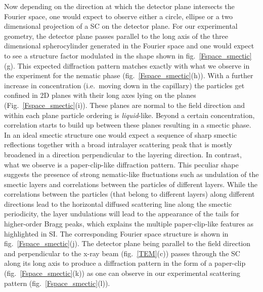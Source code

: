 \documentclass[aps,prl,preprint,superscriptaddress]{revtex4-1} %
\begin{document}
Now depending on the direction at which the detector plane intersects the Fourier space, one would expect to observe either a circle, ellipse or a two dimensional projection of a SC on the detector plane. For our experimental geometry, the detector plane passes parallel to the long axis of the three dimensional spherocylinder generated in the Fourier space and one would expect to see a structure factor modulated in the shape shown in fig.~\ref{Fspace_smectic}(g). This expected diffraction pattern matches exactly with what we observe in the experiment for the nematic phase (fig.~\ref{Fspace_smectic}(h)). With a further increase in concentration (i.e.~moving down in the capillary) the particles get confined in 2D planes with their long axes lying on the planes (Fig.~\ref{Fspace_smectic}(i)). These planes are normal to the field direction and within each plane particle ordering is \emph{liquid}-like. Beyond a certain concentration, correlation starts to build up between these planes resulting in a smectic phase. In an ideal smectic structure one would expect a sequence of sharp smectic reflections together with a broad intralayer scattering peak that is mostly broadened in a direction perpendicular to the layering direction. In contrast, what we observe is a paper-clip-like diffraction pattern. This peculiar shape suggests the presence of strong nematic-like fluctuations such as undulation of the smectic layers and correlations between the particles of different layers. While the correlations between the particles (that belong to different layers) along different directions lead to the horizontal diffused scattering line along the smectic periodicity, the layer undulations will lead to the appearance of the tails for higher-order Bragg peaks, which explains the multiple paper-clip-like features as highlighted in SI\@. The corresponding Fourier space structure is shown in fig.~\ref{Fspace_smectic}(j). The detector plane being parallel to the field direction and perpendicular to the x-ray beam (fig.~\ref{TEM}(c)) passes through the SC along its long axis to produce a diffraction pattern in the form of a paper-clip (fig.~\ref{Fspace_smectic}(k)) as one can observe in our experimental scattering pattern (fig.~\ref{Fspace_smectic}(l)).\par
\end{document}
